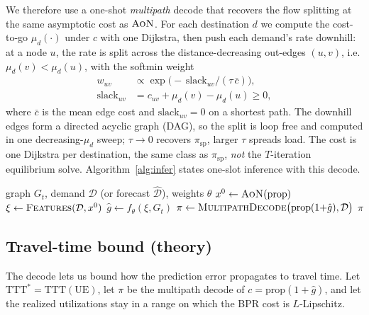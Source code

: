 \documentclass[journal]{IEEEtran}
\newcommand{\prop}{\mathrm{prop}}
\newcommand{\TTT}{\mathrm{TTT}}
\newcommand{\AoN}{\textsc{AoN}}
\begin{document}
We therefore use a one-shot \emph{multipath} decode that recovers the flow splitting at
the same asymptotic cost as $\AoN$. For each destination $d$ we compute the cost-to-go
$\mu_d(\cdot)$ under $c$ with one Dijkstra, then push each demand's rate downhill: at a
node $u$, the rate is split across the distance-decreasing out-edges $(u,v)$, i.e.
$\mu_d(v)<\mu_d(u)$, with the softmin weight
\begin{equation}
\begin{aligned}
w_{uv}&\propto \exp\!\big(-\,\mathrm{slack}_{uv}/(\tau\,\bar c)\big),\\
\mathrm{slack}_{uv}&=c_{uv}+\mu_d(v)-\mu_d(u)\ge 0,
\end{aligned}
\label{eq:split}
\end{equation}
where $\bar c$ is the mean edge cost and $\mathrm{slack}_{uv}=0$ on a shortest path. The
downhill edges form a directed acyclic graph (DAG), so the split is loop free and computed in one
decreasing-$\mu_d$ sweep; $\tau\to 0$ recovers $\pi_{\mathrm{sp}}$, larger $\tau$ spreads
load. The cost is one Dijkstra per destination, the same class as $\pi_{\mathrm{sp}}$,
\emph{not} the $T$-iteration equilibrium solve. Algorithm~\ref{alg:infer} states one-slot
inference with this decode.

\begin{algorithm}[t]
\caption{One-slot congestion-aware routing}
\label{alg:infer}
\begin{algorithmic}[1]
\Require graph $G_t$, demand $\mathcal{D}$ (or forecast $\hat{\mathcal{D}}$), weights $\theta$
\State $x^{0}\gets \AoN(\prop)$ 
\State $\xi\gets \textsc{Features}(\mathcal{D},x^{0})$
\State $\hat g\gets f_\theta(\xi,G_t)$ 
\State $\pi\gets \textsc{MultipathDecode}\big(\prop(1{+}\hat g),\mathcal{D}\big)$ 
\State \Return $\pi$
\end{algorithmic}
\end{algorithm}

\subsection{Travel-time bound (theory)}\label{sec:bound}
The decode lets us bound how the prediction error propagates to travel time. Let
$\TTT^{*}=\TTT(\mathrm{UE})$, let $\pi$ be the multipath decode of $c=\prop(1+\hat g)$, and
let the realized utilizations stay in a range on which the BPR cost is $L$-Lipschitz.
\end{document}
